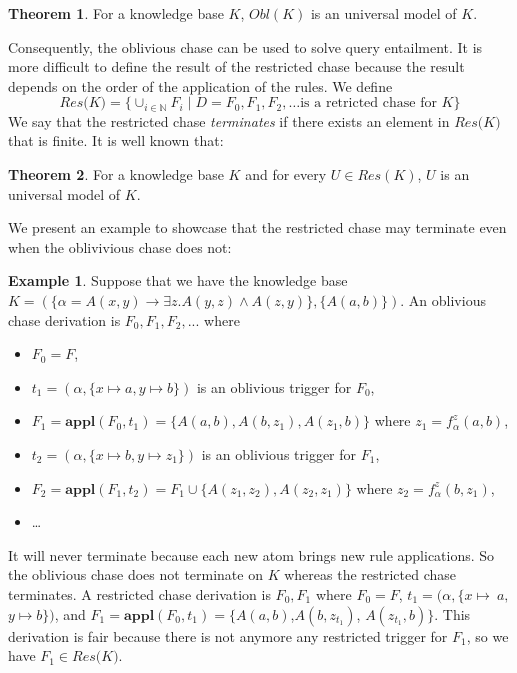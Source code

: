 \documentclass{article}
\theoremstyle{definition}
\newtheorem{theorem}{Theorem}[section]
\newtheorem{example}{Example}[section]
\theoremstyle{remark}
\def \N {\mathbb N}
\newcommand{\Appl}{\textbf{appl}}
\begin{document}
\begin{theorem}
For a knowledge base $K$, $\textit{Obl}(K)$ is an universal model of $K$.
\end{theorem}

Consequently, the oblivious chase can be used to solve query entailment. It is more difficult to define the result of the restricted chase because the result depends on the order of the application of the rules. We define $$\textit{Res(K)}=\{\cup_{i \in \N}F_i \mid D = F_0,F_1,F_2,\ldots \text{is a retricted chase for } K\}$$ We say that the restricted chase \emph{terminates} if there exists an element in $\textit{Res(K)}$ that is finite. It is well known that:

\begin{theorem}
For a knowledge base $K$ and for every $U \in \textit{Res}(K)$, $U$ is an universal model of $K$.
\end{theorem}

We present an example to showcase that the restricted chase may terminate even when the oblivivious chase does not:
\begin{example}
Suppose that we have the knowledge base $K=(\{\alpha  = A(x,y) \rightarrow \exists z.A(y,z) \wedge A(z,y)\},\{A(a,b)\})$. An oblivious chase derivation is $F_0,F_1,F_2,...$ where
\begin{itemize}
\item $F_0 = F$, 
\item $t_1=(\alpha,\{x \mapsto a, y \mapsto b\})$ is an oblivious trigger for $F_0$, 
\item $F_1= \Appl(F_0,t_1) =\{A(a,b),A(b,z_1),A(z_1,b)\}$ where $z_1 =f_\alpha^z(a,b)$,
\item $t_2=(\alpha,\{x \mapsto b, y \mapsto z_1\})$ is an oblivious trigger for $F_1$, 
\item $F_2= \Appl(F_1,t_2) =F_1 \cup \{ A(z_1,z_2), A(z_2,z_1)\}$ where $z_2= f_\alpha^z(b,z_1)$, 
\item \ldots\ 
\end{itemize} 
It will never terminate because each new atom brings new rule applications. So the oblivious chase does not terminate on $K$ whereas the restricted chase terminates. A restricted chase derivation is $F_0,F_1$ where $F_0 = F$, $t_1=(\alpha,\{x \mapsto~a,$ $y \mapsto b\})$, and $F_1= \Appl(F_0,t_1) =\{A(a,b)$,$A(b,z_{t_1})$, $A(z_{t_1},b)\}$. This derivation is fair because there is not anymore any restricted trigger for $F_1$, so we have $F_1 \in \textit{Res(K)}$.
\end{example}
\end{document}

